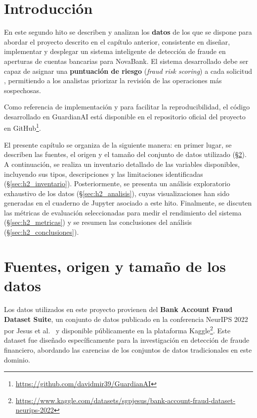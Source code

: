 \documentclass[12pt,a4paper]{report}
\begin{document}
\section{Introducción}
\label{sec:h2_intro}

En este segundo hito se describen y analizan los \textbf{datos} de los que se dispone para abordar el proyecto descrito en el capítulo anterior, consistente en diseñar, implementar y desplegar un sistema inteligente de detección de fraude en aperturas de cuentas bancarias para NovaBank. El sistema desarrollado debe ser capaz de asignar una \textbf{puntuación de riesgo} (\textit{fraud risk scoring}) a cada solicitud \cite{fraudrisk2024}, permitiendo a los analistas priorizar la revisión de las operaciones más sospechosas.

Como referencia de implementación y para facilitar la reproducibilidad, el código desarrollado en GuardianAI está disponible en el repositorio oficial del proyecto en GitHub\footnote{\url{https://github.com/davidmir39/GuardianAI}}.

El presente capítulo se organiza de la siguiente manera: en primer lugar, se describen las fuentes, el origen y el tamaño del conjunto de datos utilizado (\S\ref{sec:h2_fuentes}). A continuación, se realiza un inventario detallado de las variables disponibles, incluyendo sus tipos, descripciones y las limitaciones identificadas (\S\ref{sec:h2_inventario}). Posteriormente, se presenta un análisis exploratorio exhaustivo de los datos (\S\ref{sec:h2_analisis}), cuyas visualizaciones han sido generadas en el cuaderno de Jupyter asociado a este hito. Finalmente, se discuten las métricas de evaluación seleccionadas para medir el rendimiento del sistema (\S\ref{sec:h2_metricas}) y se resumen las conclusiones del análisis (\S\ref{sec:h2_conclusiones}).

\section{Fuentes, origen y tamaño de los datos}
\label{sec:h2_fuentes}

Los datos utilizados en este proyecto provienen del \textbf{Bank Account Fraud Dataset Suite}, un conjunto de datos publicado en la conferencia NeurIPS 2022 por Jesus et al.\ \cite{jesus2022bank} y disponible públicamente en la plataforma Kaggle\footnote{\url{https://www.kaggle.com/datasets/sgpjesus/bank-account-fraud-dataset-neurips-2022}}. Este dataset fue diseñado específicamente para la investigación en detección de fraude financiero, abordando las carencias de los conjuntos de datos tradicionales en este dominio.
\end{document}
